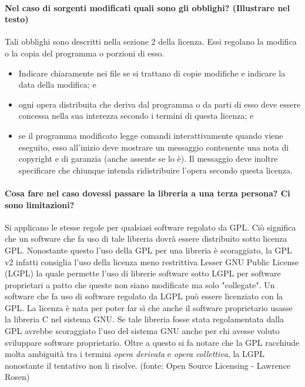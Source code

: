 \documentclass[a4paper]{article}
\begin{document}
			\paragraph{Nel caso di sorgenti modificati quali sono gli obblighi? (Illustrare nel testo)}
				Tali obblighi sono descritti nella sezione 2 della licenza. Essi regolano la modifica o la copia del programma o porzioni di esso.
				\begin{itemize}
					\item Indicare chiaramente nei file se si trattano di copie modifiche e indicare la data della modifica; e
					\item ogni opera distribuita che deriva dal programma o da parti di esso deve essere concessa nella sua interezza secondo i termini di questa licenza; e
					\item se il programma modificato legge comandi interattivamente quando viene eseguito, esso all'inizio deve mostrare un messaggio contenente una nota di copyright e di garanzia (anche assente se lo è). Il messaggio deve inoltre specificare che chiunque intenda ridistribuire l'opera secondo questa licenza.
				\end{itemize}
		
			\paragraph{Cosa fare nel caso dovessi passare la libreria a una terza persona? Ci sono limitazioni?}
				Si applicano le stesse regole per qualsiasi software regolato da GPL. Ciò significa che un software che fa uso di tale libreria dovrà essere distribuito sotto licenza GPL.
				Nonostante questo l'uso della GPL per una libreria è scoraggiato, la GPL v2 infatti consiglia l'uso della licenza meno restrittiva Lesser GNU Public License (LGPL) la quale permette l'uso di librerie software sotto LGPL per software proprietari a patto che queste non siano modificate ma solo "collegate". Un software che fa uso di software regolato da LGPL può essere licenziato con la GPL.
				La licenza è nata per poter far sì che anche il software proprietario usasse la libreria C nel sistema GNU. Se tale libreria fosse stata regolamentata dalla GPL avrebbe scoraggiato l'uso del sistema GNU anche per chi avesse voluto sviluppare software proprietario. Oltre a questo si fa notare che la GPL racchiude molta ambiguità tra i termini \textit{opera derivata} e \textit{opera collettiva}, la LGPL nonostante il tentativo non li risolve. (fonte: Open Source Licensing - Lawrence Rosen)
				
\end{document}
